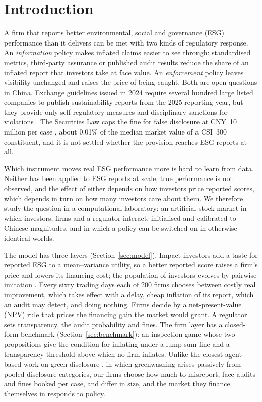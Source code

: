 \documentclass[11pt]{article}
\begin{document}
\newpage

\section{Introduction}

A firm that reports better environmental, social and governance (ESG) performance than it delivers can be met with two kinds of regulatory response. An \emph{information} policy makes inflated claims easier to see through: standardised metrics, third-party assurance or published audit results reduce the share of an inflated report that investors take at face value. An \emph{enforcement} policy leaves visibility unchanged and raises the price of being caught. Both are open questions in China. Exchange guidelines issued in 2024 require several hundred large listed companies to publish sustainability reports from the 2025 reporting year, but they provide only self-regulatory measures and disciplinary sanctions for violations \citep{sse2024guideline}. The Securities Law caps the fine for false disclosure at CNY~10 million per case \citep{securitieslaw2019}, about 0.01\% of the median market value of a CSI~300 constituent, and it is not settled whether the provision reaches ESG reports at all.

Which instrument moves real ESG performance more is hard to learn from data. Neither has been applied to ESG reports at scale, true performance is not observed, and the effect of either depends on how investors price reported scores, which depends in turn on how many investors care about them. We therefore study the question in a computational laboratory: an artificial stock market in which investors, firms and a regulator interact, initialised and calibrated to Chinese magnitudes, and in which a policy can be switched on in otherwise identical worlds.

The model has three layers (Section~\ref{sec:model}). Impact investors add a taste for reported ESG to a mean--variance utility, so a better reported score raises a firm's price and lowers its financing cost; the population of investors evolves by pairwise imitation \citep{schlag1998imitate}. Every sixty trading days each of 200 firms chooses between costly real improvement, which takes effect with a delay, cheap inflation of its report, which an audit may detect, and doing nothing. Firms decide by a net-present-value (NPV) rule that prices the financing gain the market would grant. A regulator sets transparency, the audit probability and fines. The firm layer has a closed-form benchmark (Section~\ref{sec:benchmark}): an inspection game \citep{avenhaus2002inspection} whose two propositions give the condition for inflating under a lump-sum fine and a transparency threshold above which no firm inflates. Unlike the closest agent-based work on green disclosure \citep{zhao2025agent,zhao2026green}, in which greenwashing arises passively from pooled disclosure categories, our firms choose how much to misreport, face audits and fines booked per case, and differ in size, and the market they finance themselves in responds to policy.
\end{document}
